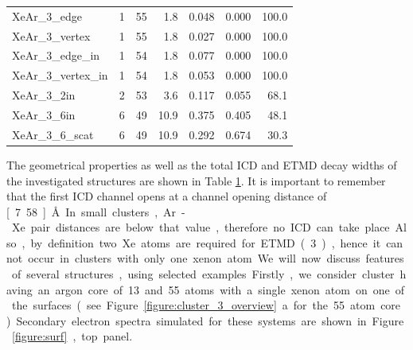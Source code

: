 \begin{table}[h]
\begin{tabular}{lrrrccr}
XeAr\_3\_edge        &      1   &     55   &  1.8  & 0.048 & 0.000 & 100.0\\ %
XeAr\_3\_vertex      &      1   &     55   &  1.8  & 0.027 & 0.000 & 100.0\\ %
XeAr\_3\_edge\_in    &      1   &     54   &  1.8  & 0.077 & 0.000 & 100.0\\ %
XeAr\_3\_vertex\_in  &      1   &     54   &  1.8  & 0.053 & 0.000 & 100.0\\ %
XeAr\_3\_2in         &      2   &     53   &  3.6  & 0.117 & 0.055 &  68.1\\ %
XeAr\_3\_6in         &      6   &     49   & 10.9  & 0.375 & 0.405 &  48.1\\ %
XeAr\_3\_6\_scat     &      6   &     49   & 10.9  & 0.292 & 0.674 &  30.3\\ %
\bottomrule
\end{tabular}
\label{table:theo_gammas}
\end{table}
%
The geometrical properties as well as the total ICD and ETMD decay widths
of the investigated structures are shown in Table \ref{table:theo_gammas}.
It is important to remember that the first ICD channel opens at a
channel opening distance of \unit[7.58]{\AA}. In small
clusters, Ar-Xe pair distances are below that value, therefore 
no ICD can take place. Also, by definition two Xe atoms are
required for ETMD(3), hence it cannot occur in clusters with only one xenon atom.
%

We will now discuss features of several structures, using selected examples.
Firstly, we consider cluster having an argon core of 13 and 55 atoms with a single xenon
atom on one of the surfaces (see Figure \ref{figure:cluster_3_overview}a
for the 55 atom core).
Secondary electron spectra simulated for these systems are shown in Figure \ref{figure:surf}, top panel.


